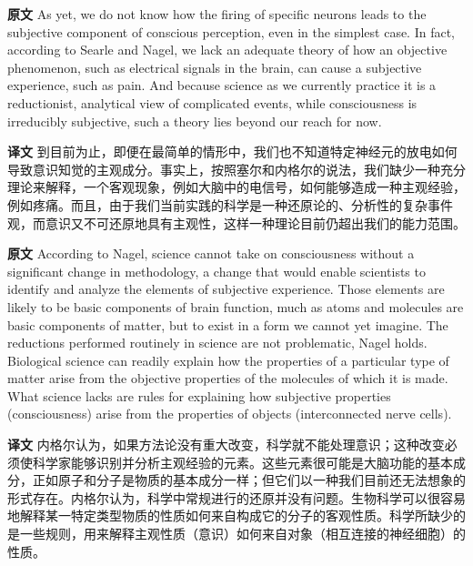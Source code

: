 \documentclass[UTF8,zihao=-4]{ctexart}
\newcommand{\BodyFont}{\fontsize{10.5pt}{15.5pt}\selectfont}
\newcommand{\origlabel}{\textbf{原文}\quad}
\newcommand{\translabel}{\textbf{译文}\quad}
\newenvironment{enblock}{\par\noindent\begingroup\BodyFont\origlabel}{\par\endgroup}
\newenvironment{zhblock}{\par\noindent\begingroup\BodyFont\translabel}{\par\endgroup\vspace{0.35em}}
\begin{document}
\begin{enblock}
As yet, we do not know how the firing of specific neurons leads to the subjective component of conscious perception, even in the simplest case. In fact, according to Searle and Nagel, we lack an adequate theory of how an objective phenomenon, such as electrical signals in the brain, can cause a subjective experience, such as pain. And because science as we currently practice it is a reductionist, analytical view of complicated events, while consciousness is irreducibly subjective, such a theory lies beyond our reach for now.
\end{enblock}
\begin{zhblock}
到目前为止，即便在最简单的情形中，我们也不知道特定神经元的放电如何导致意识知觉的主观成分。事实上，按照塞尔和内格尔的说法，我们缺少一种充分理论来解释，一个客观现象，例如大脑中的电信号，如何能够造成一种主观经验，例如疼痛。而且，由于我们当前实践的科学是一种还原论的、分析性的复杂事件观，而意识又不可还原地具有主观性，这样一种理论目前仍超出我们的能力范围。\end{zhblock}

\begin{enblock}
According to Nagel, science cannot take on consciousness without a significant change in methodology, a change that would enable scientists to identify and analyze the elements of subjective experience. Those elements are likely to be basic components of brain function, much as atoms and molecules are basic components of matter, but to exist in a form we cannot yet imagine. The reductions performed routinely in science are not problematic, Nagel holds. Biological science can readily explain how the properties of a particular type of matter arise from the objective properties of the molecules of which it is made. What science lacks are rules for explaining how subjective properties (consciousness) arise from the properties of objects (interconnected nerve cells).
\end{enblock}
\begin{zhblock}
内格尔认为，如果方法论没有重大改变，科学就不能处理意识；这种改变必须使科学家能够识别并分析主观经验的元素。这些元素很可能是大脑功能的基本成分，正如原子和分子是物质的基本成分一样；但它们以一种我们目前还无法想象的形式存在。内格尔认为，科学中常规进行的还原并没有问题。生物科学可以很容易地解释某一特定类型物质的性质如何来自构成它的分子的客观性质。科学所缺少的是一些规则，用来解释主观性质（意识）如何来自对象（相互连接的神经细胞）的性质。\end{zhblock}
\end{document}
